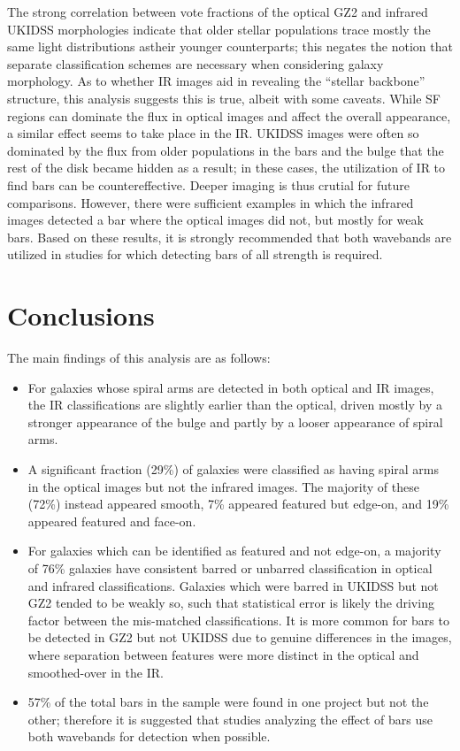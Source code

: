 The strong correlation between vote fractions of the optical GZ2 and infrared UKIDSS morphologies indicate that older stellar populations trace mostly the same light distributions astheir younger counterparts; this negates the notion \citep{Block1999} that separate classification schemes are necessary when considering galaxy morphology. As to whether IR images aid in revealing the ``stellar backbone'' structure, this analysis suggests this is true, albeit with some caveats. While SF regions can dominate the flux in optical images and affect the overall appearance, a similar effect seems to take place in the IR. UKIDSS images were often so dominated by the flux from older populations in the bars and the bulge that the rest of the disk became hidden as a result; in these cases, the utilization of IR to find bars can be countereffective. Deeper imaging is thus crutial for future comparisons. However, there were sufficient examples in which the infrared images detected a bar where the optical images did not, but mostly for weak bars. Based on these results, it is strongly recommended that both wavebands are utilized in studies for which detecting bars of all strength is required. 

\section{Conclusions}

The main findings of this analysis are as follows:

\begin{itemize}

\item For galaxies whose spiral arms are detected in both optical and IR images, the IR classifications are slightly earlier than the optical, driven mostly by a stronger appearance of the bulge and partly by a looser appearance of spiral arms. 

\item A significant fraction (29\%) of galaxies were classified as having spiral arms in the optical images but not the infrared images. The majority of these (72\%) instead appeared smooth, 7\% appeared featured but edge-on, and 19\% appeared featured and face-on.

\item For galaxies which can be identified as featured and not edge-on, a majority of 76\% galaxies have consistent barred or unbarred classification in optical and infrared classifications. Galaxies which were barred in UKIDSS but not GZ2 tended to be weakly so, such that statistical error is likely the driving factor between the mis-matched classifications. It is more common for bars to be detected in GZ2 but not UKIDSS due to genuine differences in the images, where separation between features were more distinct in the optical and smoothed-over in the IR.

\item 57\% of the total bars in the sample were found in one project but not the other; therefore it is suggested that studies analyzing the effect of bars use both wavebands for detection when possible.  


\end{itemize}
